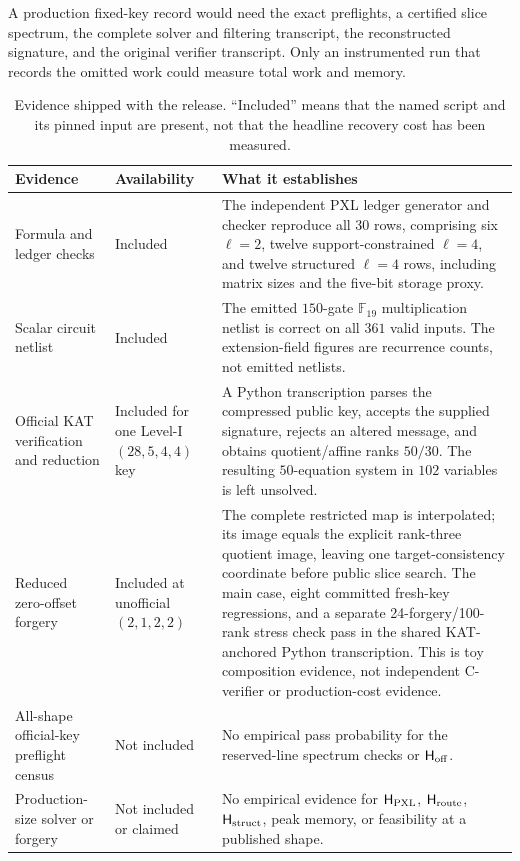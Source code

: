 \documentclass[11pt]{article}
\newcommand{\F}{\mathbb F}
\begin{document}
A production fixed-key record would need the exact preflights, a certified
slice spectrum, the complete solver and filtering transcript, the reconstructed
signature, and the original verifier transcript.  Only an instrumented run
that records the omitted work could measure total work and memory.

\begin{table}[t]
\centering
\caption{Evidence shipped with the release.  ``Included'' means that the
named script and its pinned input are present, not that the headline recovery
cost has been measured.}
\label{tab:evidence-hierarchy}
\small
\renewcommand{\arraystretch}{1.14}
\begin{tabularx}{0.98\textwidth}{@{}>{\raggedright\arraybackslash}p{}>{\raggedright\arraybackslash}p{}X@{}}
\toprule
Evidence & Availability & What it establishes\\
\midrule
Formula and ledger checks & Included & The independent PXL ledger generator and checker reproduce all 30 rows, comprising six $\ell=2$, twelve support-constrained $\ell=4$, and twelve structured $\ell=4$ rows, including matrix sizes and the five-bit storage proxy.\\
Scalar circuit netlist & Included & The emitted $150$-gate $\F_{19}$ multiplication netlist is correct on all $361$ valid inputs.  The extension-field figures are recurrence counts, not emitted netlists.\\
Official KAT verification and reduction & Included for one Level-I $(28,5,4,4)$ key & A Python transcription parses the compressed public key, accepts the supplied signature, rejects an altered message, and obtains quotient/affine ranks $50/30$.  The resulting $50$-equation system in $102$ variables is left unsolved.\\
Reduced zero-offset forgery & Included at unofficial $(2,1,2,2)$ & The complete restricted map is interpolated; its image equals the explicit rank-three quotient image, leaving one target-consistency coordinate before public slice search.  The main case, eight committed fresh-key regressions, and a separate 24-forgery/100-rank stress check pass in the shared KAT-anchored Python transcription.  This is toy composition evidence, not independent C-verifier or production-cost evidence.\\
All-shape official-key preflight census & Not included & No empirical pass probability for the reserved-line spectrum checks or $\mathsf H_{\rm off}$.\\
Production-size solver or forgery & Not included or claimed & No empirical evidence for $\mathsf H_{\rm PXL}$, $\mathsf H_{\rm route}$, $\mathsf H_{\rm struct}$, peak memory, or feasibility at a published shape.\\
\bottomrule
\end{tabularx}
\end{table}
\end{document}

